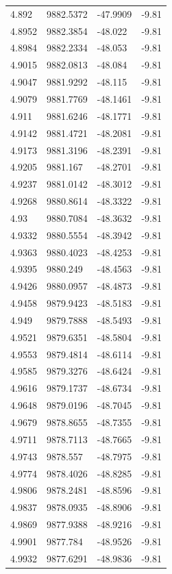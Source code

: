 \begin{table}[H]
\begin{tabular}{llll}
4.892 & 9882.5372 & -47.9909 & -9.81 \\
4.8952 & 9882.3854 & -48.022 & -9.81 \\
4.8984 & 9882.2334 & -48.053 & -9.81 \\
4.9015 & 9882.0813 & -48.084 & -9.81 \\
4.9047 & 9881.9292 & -48.115 & -9.81 \\
4.9079 & 9881.7769 & -48.1461 & -9.81 \\
4.911 & 9881.6246 & -48.1771 & -9.81 \\
4.9142 & 9881.4721 & -48.2081 & -9.81 \\
4.9173 & 9881.3196 & -48.2391 & -9.81 \\
4.9205 & 9881.167 & -48.2701 & -9.81 \\
4.9237 & 9881.0142 & -48.3012 & -9.81 \\
4.9268 & 9880.8614 & -48.3322 & -9.81 \\
4.93 & 9880.7084 & -48.3632 & -9.81 \\
4.9332 & 9880.5554 & -48.3942 & -9.81 \\
4.9363 & 9880.4023 & -48.4253 & -9.81 \\
4.9395 & 9880.249 & -48.4563 & -9.81 \\
4.9426 & 9880.0957 & -48.4873 & -9.81 \\
4.9458 & 9879.9423 & -48.5183 & -9.81 \\
4.949 & 9879.7888 & -48.5493 & -9.81 \\
4.9521 & 9879.6351 & -48.5804 & -9.81 \\
4.9553 & 9879.4814 & -48.6114 & -9.81 \\
4.9585 & 9879.3276 & -48.6424 & -9.81 \\
4.9616 & 9879.1737 & -48.6734 & -9.81 \\
4.9648 & 9879.0196 & -48.7045 & -9.81 \\
4.9679 & 9878.8655 & -48.7355 & -9.81 \\
4.9711 & 9878.7113 & -48.7665 & -9.81 \\
4.9743 & 9878.557 & -48.7975 & -9.81 \\
4.9774 & 9878.4026 & -48.8285 & -9.81 \\
4.9806 & 9878.2481 & -48.8596 & -9.81 \\
4.9837 & 9878.0935 & -48.8906 & -9.81 \\
4.9869 & 9877.9388 & -48.9216 & -9.81 \\
4.9901 & 9877.784 & -48.9526 & -9.81 \\
4.9932 & 9877.6291 & -48.9836 & -9.81 \\

\end{tabular}
\end{table}
